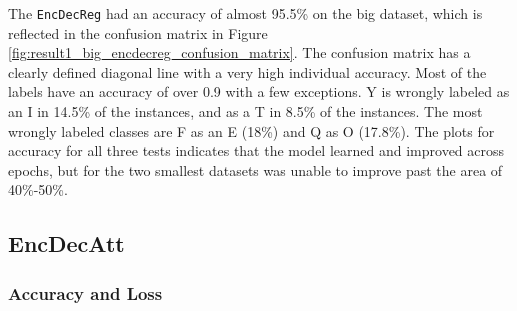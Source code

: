 The {\tt EncDecReg} had an accuracy of almost 95.5\% on the big dataset, which is reflected in the confusion matrix in Figure \ref{fig:result1_big_encdecreg_confusion_matrix}. The confusion matrix has a clearly defined diagonal line with a very high individual accuracy. Most of the labels have an accuracy of over 0.9 with a few exceptions. Y is wrongly labeled as an I in 14.5\% of the instances, and as a T in 8.5\% of the instances. The most wrongly labeled classes are F as an E (18\%) and Q as O (17.8\%). The plots for accuracy for all three tests indicates that the model learned and improved across epochs, but for the two smallest datasets was unable to improve past the area of 40\%-50\%. 

\subsection{EncDecAtt}
\subsubsection{Accuracy and Loss}

\newpage
